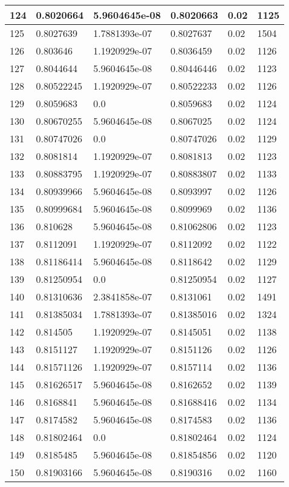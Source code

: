 \begin{longtable}{|l|l|l|l|l|l|}
124 & 0.8020664 & 5.9604645e-08 & 0.8020663 & 0.02 & 1125 \\ \hline 
125 & 0.8027639 & 1.7881393e-07 & 0.8027637 & 0.02 & 1504 \\ \hline 
126 & 0.803646 & 1.1920929e-07 & 0.8036459 & 0.02 & 1126 \\ \hline 
127 & 0.8044644 & 5.9604645e-08 & 0.80446446 & 0.02 & 1123 \\ \hline 
128 & 0.80522245 & 1.1920929e-07 & 0.80522233 & 0.02 & 1126 \\ \hline 
129 & 0.8059683 & 0.0 & 0.8059683 & 0.02 & 1124 \\ \hline 
130 & 0.80670255 & 5.9604645e-08 & 0.8067025 & 0.02 & 1124 \\ \hline 
131 & 0.80747026 & 0.0 & 0.80747026 & 0.02 & 1129 \\ \hline 
132 & 0.8081814 & 1.1920929e-07 & 0.8081813 & 0.02 & 1123 \\ \hline 
133 & 0.80883795 & 1.1920929e-07 & 0.80883807 & 0.02 & 1133 \\ \hline 
134 & 0.80939966 & 5.9604645e-08 & 0.8093997 & 0.02 & 1126 \\ \hline 
135 & 0.80999684 & 5.9604645e-08 & 0.8099969 & 0.02 & 1136 \\ \hline 
136 & 0.810628 & 5.9604645e-08 & 0.81062806 & 0.02 & 1123 \\ \hline 
137 & 0.8112091 & 1.1920929e-07 & 0.8112092 & 0.02 & 1122 \\ \hline 
138 & 0.81186414 & 5.9604645e-08 & 0.8118642 & 0.02 & 1129 \\ \hline 
139 & 0.81250954 & 0.0 & 0.81250954 & 0.02 & 1127 \\ \hline 
140 & 0.81310636 & 2.3841858e-07 & 0.8131061 & 0.02 & 1491 \\ \hline 
141 & 0.81385034 & 1.7881393e-07 & 0.81385016 & 0.02 & 1324 \\ \hline 
142 & 0.814505 & 1.1920929e-07 & 0.8145051 & 0.02 & 1138 \\ \hline 
143 & 0.8151127 & 1.1920929e-07 & 0.8151126 & 0.02 & 1126 \\ \hline 
144 & 0.81571126 & 1.1920929e-07 & 0.8157114 & 0.02 & 1136 \\ \hline 
145 & 0.81626517 & 5.9604645e-08 & 0.8162652 & 0.02 & 1139 \\ \hline 
146 & 0.8168841 & 5.9604645e-08 & 0.81688416 & 0.02 & 1134 \\ \hline 
147 & 0.8174582 & 5.9604645e-08 & 0.8174583 & 0.02 & 1136 \\ \hline 
148 & 0.81802464 & 0.0 & 0.81802464 & 0.02 & 1124 \\ \hline 
149 & 0.8185485 & 5.9604645e-08 & 0.81854856 & 0.02 & 1120 \\ \hline 
150 & 0.81903166 & 5.9604645e-08 & 0.8190316 & 0.02 & 1160 \\ \hline 
\end{longtable}